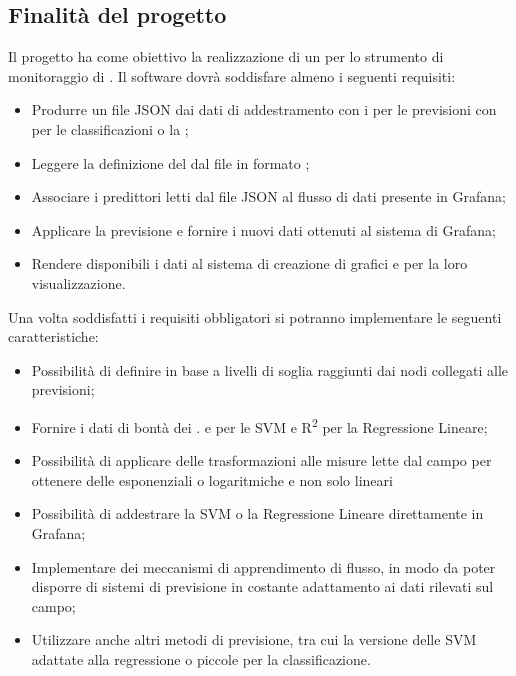 \documentclass[../studio-di-fattibilita.tex]{subfiles}
\begin{document}
\subsection{Finalità del progetto}%
\label{sub:finalita_del_progetto}
Il progetto ha come obiettivo la realizzazione di un  per lo strumento di monitoraggio di .
Il software dovrà soddisfare almeno i seguenti requisiti:
\begin{itemize}
  \item Produrre un file JSON dai dati di addestramento con i  per le previsioni con  per le classificazioni o la ;
  \item Leggere la definizione del  dal file in formato ;
  \item Associare i predittori letti dal file JSON al flusso di dati presente in Grafana;
  \item Applicare la previsione e fornire i nuovi dati ottenuti al sistema di Grafana;
  \item Rendere disponibili i dati al sistema di creazione di grafici e  per la loro visualizzazione.
\end{itemize}
Una volta soddisfatti i requisiti obbligatori si potranno implementare le seguenti caratteristiche:
\begin{itemize}
  \item Possibilità di definire  in base a livelli di soglia raggiunti dai nodi collegati alle previsioni;
  \item Fornire i dati di bontà dei .  e  per le SVM e R\textsuperscript{2} per la Regressione Lineare;
  \item Possibilità di applicare delle trasformazioni alle misure lette dal campo per ottenere delle  esponenziali o logaritmiche e non solo lineari
  \item Possibilità di addestrare la SVM o la Regressione Lineare direttamente in Grafana;
  \item Implementare dei meccanismi di apprendimento di flusso, in modo da poter disporre di sistemi di previsione in costante adattamento ai dati rilevati sul campo;
  \item Utilizzare anche altri metodi di previsione, tra cui la versione delle SVM adattate alla regressione o piccole  per la classificazione.
\end{itemize}
\end{document}

